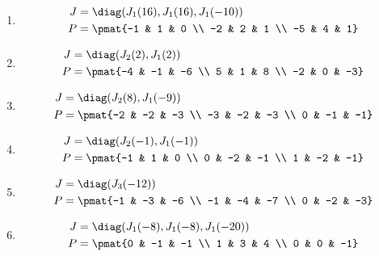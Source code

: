 \begin{enumerate}
\item

\begin{align*}
J &= \diag(J_{1}(16), J_{1}(16), J_{1}(-10))\\
P &= \pmat{-1 & 1 & 0 \\ -2 & 2 & 1 \\ -5 & 4 & 1}
\end{align*}

\item

\begin{align*}
J &= \diag(J_{2}(2), J_{1}(2))\\
P &= \pmat{-4 & -1 & -6 \\ 5 & 1 & 8 \\ -2 & 0 & -3}
\end{align*}

\item

\begin{align*}
J &= \diag(J_{2}(8), J_{1}(-9))\\
P &= \pmat{-2 & -2 & -3 \\ -3 & -2 & -3 \\ 0 & -1 & -1}
\end{align*}

\item

\begin{align*}
J &= \diag(J_{2}(-1), J_{1}(-1))\\
P &= \pmat{-1 & 1 & 0 \\ 0 & -2 & -1 \\ 1 & -2 & -1}
\end{align*}

\item

\begin{align*}
J &= \diag(J_{3}(-12))\\
P &= \pmat{-1 & -3 & -6 \\ -1 & -4 & -7 \\ 0 & -2 & -3}
\end{align*}

\item

\begin{align*}
J &= \diag(J_{1}(-8), J_{1}(-8), J_{1}(-20))\\
P &= \pmat{0 & -1 & -1 \\ 1 & 3 & 4 \\ 0 & 0 & -1}
\end{align*}


\end{enumerate}
